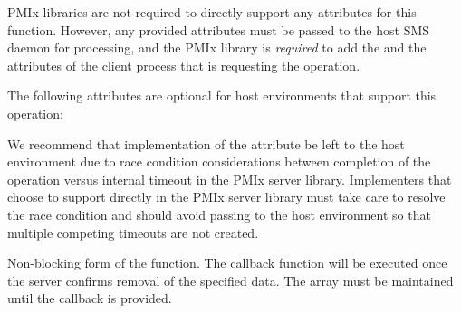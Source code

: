 \reqattrstart
\ac{PMIx} libraries are not required to directly support any attributes for this function. However, any provided attributes must be passed to the host \ac{SMS} daemon for processing, and the \ac{PMIx} library is \textit{required} to add the  and the  attributes of the client process that is requesting the operation.

\reqattrend

\optattrstart
The following attributes are optional for host environments that support this operation:


\optattrend

\adviceimplstart
We recommend that implementation of the  attribute be left to the host environment due to race condition considerations between completion of the operation versus internal timeout in the \ac{PMIx} server library. Implementers that choose to support  directly in the \ac{PMIx} server library must take care to resolve the race condition and should avoid passing  to the host environment so that multiple competing timeouts are not created.
\adviceimplend

\descr

Non-blocking form of the  function.
The callback function will be executed once the server confirms removal of the specified data. The  array must be maintained until the callback is provided.



